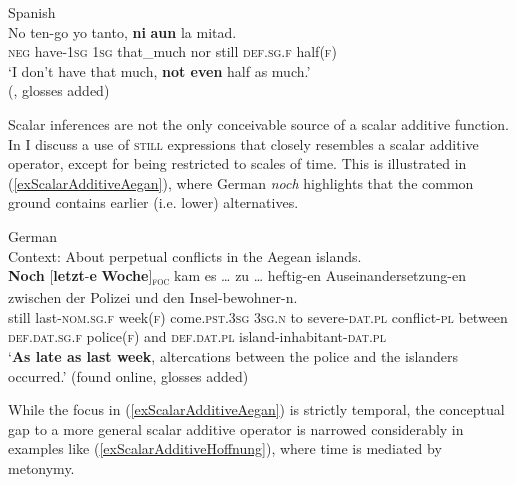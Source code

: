 {\begin{exe}
	\ex Spanish\label{exScalarAdditiveNiAun}\\
	\gll No ten-go yo tanto, \textbf{ni} \textbf{aun} la mitad.\\
	\textsc{neg} have-1\textsc{sg} 1\textsc{sg} that\_much nor still \textsc{def}.\textsc{sg}.\textsc{f} half(\textsc{f})\\
	\glt \lq I don't have that much, \textbf{not even} half as much.\rq{}
	\\(\cite[s.v. \textit{aun}]{RAEDictionary}, glosses added)
\end{exe}

Scalar inferences are not the only conceivable source of a scalar additive function. In  I discuss a use of \textsc{still} expressions that closely resembles a scalar additive operator, except for being restricted to scales of time. This is illustrated in (\ref{exScalarAdditiveAegan}), where German \textit{noch} highlights that the common ground contains earlier (i.e. lower) alternatives.

\begin{exe}
	\ex German\label{exScalarAdditiveAegan}\\
	Context: About perpetual conflicts in the Aegean islands.\\
	\gll \textbf{Noch} \textup{[}\textbf{letzt}-\textbf{e} \textbf{Woche}\textup{]\textsubscript{\textsc{foc}}} kam es … zu … heftig-en Auseinandersetzung-en zwischen der Polizei und den Insel-bewohner-n.\\
	still last-\textsc{nom}.\textsc{sg}.\textsc{f} week(\textsc{f}) come.\textsc{pst}.3\textsc{sg} 3\textsc{sg}.\textsc{n} {} to {} severe-\textsc{dat}.\textsc{pl} conflict-\textsc{pl} between \textsc{def}.\textsc{dat}.\textsc{sg}.\textsc{f} police(\textsc{f}) and \textsc{def}.\textsc{dat}.\textsc{pl} island-inhabitant-\textsc{dat}.\textsc{pl}\\
	\glt \lq \textbf{As late as last week}, altercations between the police and the islanders occurred.\rq{ }(found online, glosses added)%
\end{exe}

While the focus in (\ref{exScalarAdditiveAegan}) is strictly temporal, the conceptual gap to a more general scalar additive operator is narrowed considerably in examples like (\ref{exScalarAdditiveHoffnung}), where time is mediated by metonymy.

}

